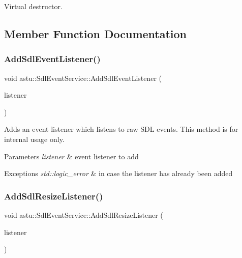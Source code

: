 Virtual destructor. 

\subsection{Member Function Documentation}
\mbox{\label{classastu_1_1SdlEventService_ab279fe046c27bf9b6468dfbd8df5ff20}} 
\subsubsection{\texorpdfstring{Add\+Sdl\+Event\+Listener()}{AddSdlEventListener()}}
{\footnotesize\ttfamily void astu\+::\+Sdl\+Event\+Service\+::\+Add\+Sdl\+Event\+Listener (\begin{DoxyParamCaption}\item[{I\+Sdl\+Event\+Listener \&}]{listener }\end{DoxyParamCaption})}

Adds an event listener which listens to raw S\+DL events. This method is for internal usage only.


\begin{DoxyParams}{Parameters}
{\em listener} & event listener to add \\
\hline
\end{DoxyParams}

\begin{DoxyExceptions}{Exceptions}
{\em std\+::logic\+\_\+error} & in case the listener has already been added \\
\hline
\end{DoxyExceptions}
\mbox{\label{classastu_1_1SdlEventService_a54a2aba51c214090a484a743ccabf6f5}} 
\subsubsection{\texorpdfstring{Add\+Sdl\+Resize\+Listener()}{AddSdlResizeListener()}}
{\footnotesize\ttfamily void astu\+::\+Sdl\+Event\+Service\+::\+Add\+Sdl\+Resize\+Listener (\begin{DoxyParamCaption}\item[{\hyperlink{classastu_1_1ISdlResizeListener}{I\+Sdl\+Resize\+Listener} \&}]{listener }\end{DoxyParamCaption})}

